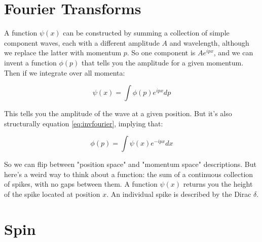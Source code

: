 \section{Fourier Transforms}

A function $\psi(x)$ can be constructed by summing a collection of simple component waves, each with a different amplitude $A$ and wavelength, although we replace the latter with momentum $p$. So one component is $Ae^{ipx}$, and we can invent a function $\phi(p)$ that tells you the amplitude for a given momentum. Then if we integrate over all momenta:

$$\psi(x) = \int \phi(p)e^{ipx} dp$$

This tells you the amplitude of the wave at a given position. But it's also structurally equation \ref{eq:invfourier}, implying that:

$$\phi(p) = \int \psi(x)e^{-ipx} dx$$

So we can flip between "position space" and "momentum space" descriptions. But here's a weird way to think about a function: the sum of a continuous collection of spikes, with no gaps between them. A function $\psi(x)$ returns you the height of the spike located at position $x$. An individual spike is described by the Dirac $\delta$.

\section{Spin}

